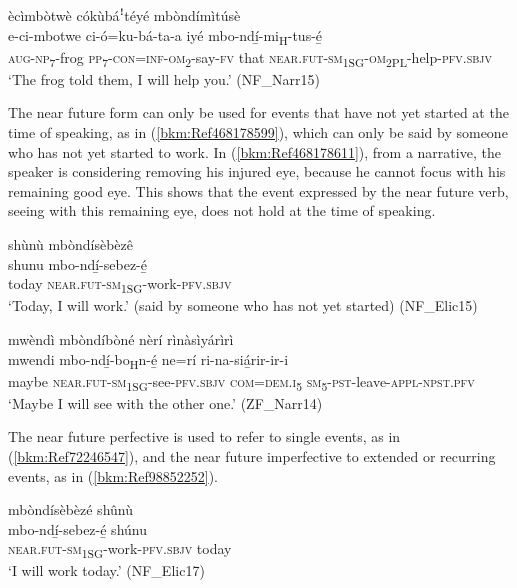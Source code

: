 \ea
\label{bkm:Ref431817599}
ècìmbòtwè cókùbáꜝtéyé mbòndímìtúsè\\
\gll e-ci-mbotwe    ci-ó=ku-bá-ta-a     iyé  mbo-ndí̲-mi\textsubscript{H}-tus-é̲ \\
\textsc{aug}-\textsc{np}\textsubscript{7}-frog  \textsc{pp}\textsubscript{7}-\textsc{con}=\textsc{inf}-\textsc{om}\textsubscript{2}-say-\textsc{fv}  that 
\textsc{near}.\textsc{fut}-\textsc{sm}\textsubscript{1SG}-\textsc{om}\textsubscript{2PL}-help-\textsc{pfv}.\textsc{sbjv}\\
\glt ‘The frog told them, I will help you.’ (NF\_Narr15)
\z

The near future form can only be used for events that have not yet started at the time of speaking, as in (\ref{bkm:Ref468178599}), which can only be said by someone who has not yet started to work. In (\ref{bkm:Ref468178611}), from a narrative, the speaker is considering removing his injured eye, because he cannot focus with his remaining good eye. This shows that the event expressed by the near future verb, seeing with this remaining eye, does not hold at the time of speaking.

\ea
\label{bkm:Ref468178599}
shùnù mbòndísèbèzê\\
\gll shunu  mbo-ndí̲-sebez-é̲\\
today  \textsc{near}.\textsc{fut}-\textsc{sm}\textsubscript{1SG}-work-\textsc{pfv}.\textsc{sbjv}\\
\glt ‘Today, I will work.’ (said by someone who has not yet started) (NF\_Elic15)
\z

\ea
\label{bkm:Ref468178611}
mwèndì mbòndíbòné nèrí rìnàsìyárìrì\\
\gll mwendi  mbo-ndí̲-bo\textsubscript{H}n-é̲  ne=rí    ri-na-siá̲rir-ir-i \\
maybe  \textsc{near}.\textsc{fut}-\textsc{sm}\textsubscript{1SG}-see-\textsc{pfv}.\textsc{sbjv}
\textsc{com}=\textsc{dem}.\textsc{i}\textsubscript{5}  \textsc{sm}\textsubscript{5}-\textsc{pst}-leave-\textsc{appl}-\textsc{npst}.\textsc{pfv}\\
\glt ‘Maybe I will see with the other one.’ (ZF\_Narr14)
\z

The near future perfective is used to refer to single events, as in (\ref{bkm:Ref72246547}), and the near future imperfective to extended or recurring events, as in (\ref{bkm:Ref98852252}).

\ea
\label{bkm:Ref72246547}
mbòndísèbèzé shûnù\\
\gll mbo-ndí̲-sebez-é̲      shúnu\\
\textsc{near}.\textsc{fut}-\textsc{sm}\textsubscript{1SG}-work-\textsc{pfv}.\textsc{sbjv}  today\\
\glt ‘I will work today.’ (NF\_Elic17)
\z

